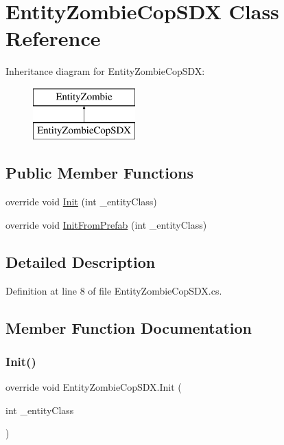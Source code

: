 \hypertarget{class_entity_zombie_cop_s_d_x}{}\section{Entity\+Zombie\+Cop\+S\+DX Class Reference}
\label{class_entity_zombie_cop_s_d_x}
Inheritance diagram for Entity\+Zombie\+Cop\+S\+DX\+:\begin{figure}[H]
\begin{center}
\leavevmode
\includegraphics[height=2.000000cm]{da/ded/class_entity_zombie_cop_s_d_x}
\end{center}
\end{figure}
\subsection*{Public Member Functions}
\begin{DoxyCompactItemize}
\item 
override void \mbox{\hyperlink{class_entity_zombie_cop_s_d_x_a1395d94fa14c7e16a54068a14d357e8c}{Init}} (int \+\_\+entity\+Class)
\item 
override void \mbox{\hyperlink{class_entity_zombie_cop_s_d_x_af297cafb54a41a88d234b6943d4a283f}{Init\+From\+Prefab}} (int \+\_\+entity\+Class)
\end{DoxyCompactItemize}


\subsection{Detailed Description}


Definition at line 8 of file Entity\+Zombie\+Cop\+S\+D\+X.\+cs.



\subsection{Member Function Documentation}
\mbox{\label{class_entity_zombie_cop_s_d_x_a1395d94fa14c7e16a54068a14d357e8c}} 
\subsubsection{\texorpdfstring{Init()}{Init()}}
{\footnotesize\ttfamily override void Entity\+Zombie\+Cop\+S\+D\+X.\+Init (\begin{DoxyParamCaption}\item[{int}]{\+\_\+entity\+Class }\end{DoxyParamCaption})}




